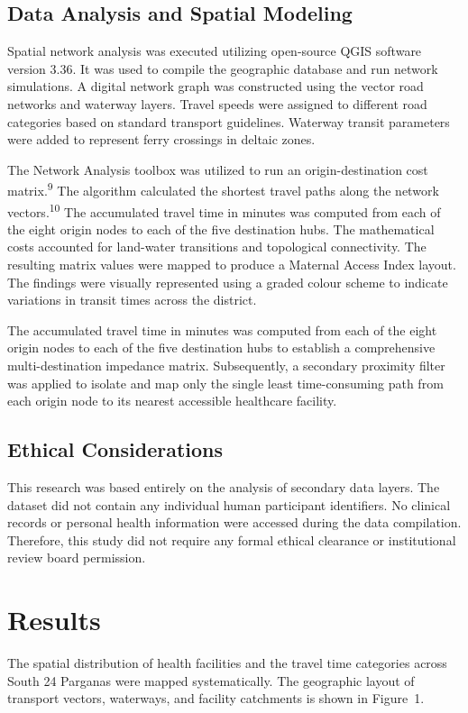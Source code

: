 \documentclass[10pt,twocolumn,letterpaper]{article}
\renewcommand{\cite}[1]{\textsuperscript{#1}}
\begin{document}
\subsection{Data Analysis and Spatial Modeling}
Spatial network analysis was executed utilizing open-source QGIS software version 3.36. It was used to compile the geographic database and run network simulations. A digital network graph was constructed using the vector road networks and waterway layers. Travel speeds were assigned to different road categories based on standard transport guidelines. Waterway transit parameters were added to represent ferry crossings in deltaic zones.

The Network Analysis toolbox was utilized to run an origin-destination cost matrix.\cite{9} The algorithm calculated the shortest travel paths along the network vectors.\cite{10} The accumulated travel time in minutes was computed from each of the eight origin nodes to each of the five destination hubs. The mathematical costs accounted for land-water transitions and topological connectivity. The resulting matrix values were mapped to produce a Maternal Access Index layout. The findings were visually represented using a graded colour scheme to indicate variations in transit times across the district.

The accumulated travel time in minutes was computed from each of the eight origin nodes to each of the five destination hubs to establish a comprehensive multi-destination impedance matrix. Subsequently, a secondary proximity filter was applied to isolate and map only the single least time-consuming path from each origin node to its nearest accessible healthcare facility.

\subsection{Ethical Considerations}
This research was based entirely on the analysis of secondary data layers. The dataset did not contain any individual human participant identifiers. No clinical records or personal health information were accessed during the data compilation. Therefore, this study did not require any formal ethical clearance or institutional review board permission.

\section{Results}
The spatial distribution of health facilities and the travel time categories across South 24 Parganas were mapped systematically. The geographic layout of transport vectors, waterways, and facility catchments is shown in Figure~1.
\end{document}
